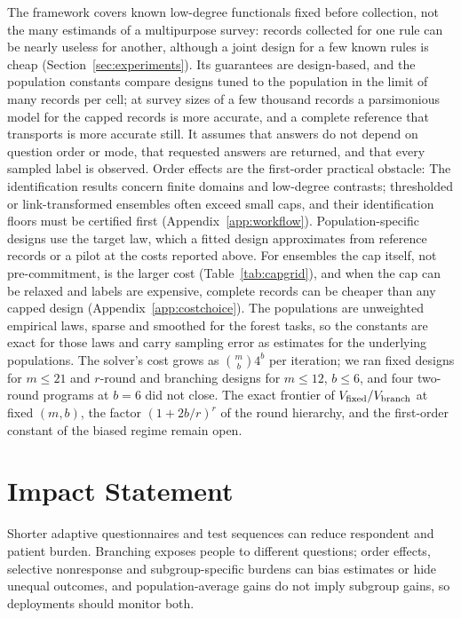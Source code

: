 \documentclass{article}
\begin{document}
The framework covers known low-degree functionals fixed before collection, not the many estimands of a multipurpose survey: records collected for one rule can be nearly useless for another, although a joint design for a few known rules is cheap (Section~\ref{sec:experiments}). Its guarantees are design-based, and the population constants compare designs tuned to the population in the limit of many records per cell; at survey sizes of a few thousand records a parsimonious model for the capped records is more accurate, and a complete reference that transports is more accurate still. It assumes that answers do not depend on question order or mode, that requested answers are returned, and that every sampled label is observed. Order effects are the first-order practical obstacle: \nOrderSentence{} The identification results concern finite domains and low-degree contrasts; thresholded or link-transformed ensembles often exceed small caps, and their identification floors must be certified first (Appendix~\ref{app:workflow}). Population-specific designs use the target law, which a fitted design approximates from reference records or a pilot at the costs reported above. For ensembles the cap itself, not pre-commitment, is the larger cost (Table~\ref{tab:capgrid}), and when the cap can be relaxed and labels are expensive, complete records can be cheaper than any capped design (Appendix~\ref{app:costchoice}). The populations are unweighted empirical laws, sparse and smoothed for the forest tasks, so the constants are exact for those laws and carry sampling error as estimates for the underlying populations. The solver's cost grows as $\binom mb4^b$ per iteration; we ran fixed designs for $m\le21$ and $r$-round and branching designs for $m\le12$, $b\le6$, and four two-round programs at $b=6$ did not close. The exact frontier of $V_{\rm fixed}/V_{\rm branch}$ at fixed $(m,b)$, the factor $(1+2b/r)^r$ of the round hierarchy, and the first-order constant of the biased regime remain open.

\section*{Impact Statement}
Shorter adaptive questionnaires and test sequences can reduce respondent and patient burden. Branching exposes people to different questions; order effects, selective nonresponse and subgroup-specific burdens can bias estimates or hide unequal outcomes, and population-average gains do not imply subgroup gains, so deployments should monitor both.



\clearpage
\onecolumn
\raggedbottom
\appendix
{}

\end{document}
